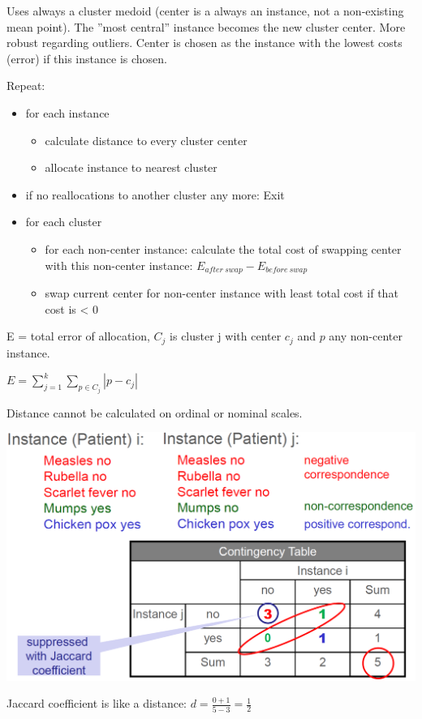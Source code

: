 \begin{breakbox}
 Uses always a cluster medoid (center is a always an instance, not a non-existing mean point). The ''most central'' instance becomes the new cluster center. More robust regarding outliers. Center is chosen as the instance with the lowest costs (error) if this instance is chosen.

Repeat:
\begin{itemize}
	\item for each instance
	\begin{itemize}
	\item calculate distance to every cluster center
	\item allocate instance to nearest cluster
	\end{itemize}
	\item if no reallocations to another cluster any more: Exit
	\item for each cluster
	\begin{itemize}
	\item for each non-center instance: calculate the total cost of swapping center with this
	non-center instance: $E_{after\ swap} - E_{before\ swap}$
	\item swap current center for non-center instance with least total
	cost if that cost is < 0
	\end{itemize}
\end{itemize}

E = total error of allocation, $C_j$ is cluster j with center $c_j$ and $p$ any non-center instance.
\begin{center}
	$E=\sum_{j=1}^{k} \sum_{p \in C_j}^{} |p-c_j|$
\end{center}

\end{breakbox}

\begin{breakbox}
Distance cannot be calculated on ordinal or nominal scales.

\begin{center}
	\includegraphics[width=.15\textwidth]{slides_images/clustering_binary_distance.png}
\end{center}

Jaccard coefficient is like a distance: $d=\frac{0+1}{5-3} = \frac{1}{2}$
\end{breakbox}



